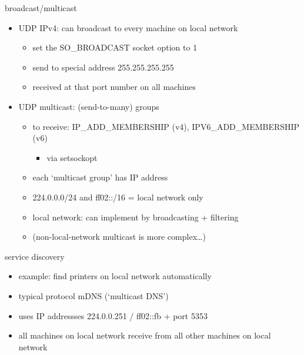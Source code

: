 \begin{frame}{broadcast/multicast}
\begin{itemize}
\item UDP IPv4: can broadcast to every machine on local network
    \begin{itemize}
    \item set the SO\_BROADCAST socket option to 1
    \item send to special address 255.255.255.255 
    \item received at that port number on all machines
    \end{itemize}
\item UDP multicast: (send-to-many) groups
    \begin{itemize}
    \item to receive: IP\_ADD\_MEMBERSHIP (v4), IPV6\_ADD\_MEMBERSHIP (v6)
        \begin{itemize}
        \item via setsockopt
        \end{itemize}
    \item each `multicast group' has IP address
    \item 224.0.0.0/24 and ff02::/16 = local network only
    \item local network: can implement by broadcasting + filtering
    \item (non-local-network multicast is more complex\ldots)
    \end{itemize}
\end{itemize}
\end{frame}

\begin{frame}{service discovery}
\begin{itemize}
\item example: find printers on local network automatically
\vspace{.5cm}
\item typical protocol mDNS (`multicast DNS')
\item uses IP addressses 224.0.0.251 / ff02::fb + port 5353
\item all machines on local network receive from all other machines on local network
\end{itemize}
\end{frame}
